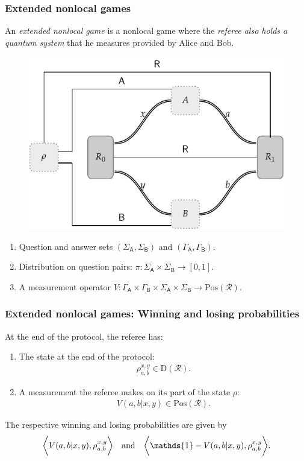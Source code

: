 \documentclass{beamer}
\def\I{\mathds{1}}
\newcommand{\biggip}[2]{\biggl\langle #1, #2 \biggr\rangle}
\def\R{\mathcal{R}}
\def \GammaA{\Gamma_{\reg{A}}}
\def \GammaB{\Gamma_{\reg{B}}}
\def \SigmaA{\Sigma_{\reg{A}}}
\def \SigmaB{\Sigma_{\reg{B}}}
\newcommand{\setft}[1]{\mathrm{#1}}
\newcommand{\Density}{\setft{D}}
\newcommand{\Pos}{\setft{Pos}}
\newcommand{\reg}[1]{\mathsf{#1}}
\begin{document}
\begin{frame}
	\frametitle{Extended nonlocal games}
	An \emph{extended nonlocal game} is a nonlocal game where the \emph{referee also holds a quantum system} that he measures provided by Alice and Bob. 
	\begin{figure}[!htpb] \label{fig:extended-nonlocal-game}
	\begin{center}
		\includegraphics[scale=0.7]{figures/enlg_2.pdf}
	\end{center}
\end{figure}
	\begin{enumerate}
		\item Question and answer sets $(\SigmaA,\SigmaB)$ and $(\GammaA,\GammaB)$. \vspace{1mm}		
		\item Distribution on question pairs: $\pi: \SigmaA \times \SigmaB \rightarrow [0,1]$.\vspace{1mm}
		\item A measurement operator $V: \GammaA \times \GammaB \times \SigmaA \times \SigmaB \rightarrow \Pos(\R)$.
	\end{enumerate}
\end{frame}

\begin{frame}
	\frametitle{Extended nonlocal games: Winning and losing probabilities}
	At the end of the protocol, the referee has: 
		\begin{enumerate}
			\item The state at the end of the protocol: 
				\begin{align*}
					\rho_{a,b}^{x,y} \in \Density(\R).
				\end{align*}
			\item A measurement the referee makes on its part of the state $\rho$: 
			\begin{align*}
				V(a,b|x,y) \in \Pos(\R).
			\end{align*}				
		\end{enumerate}
	The respective winning and losing probabilities are given by
		\begin{align*}
			\biggip{V(a,b|x,y)}{\rho_{a,b}^{x,y}} \quad \textnormal{and} \quad \biggip{\I - V(a,b|x,y)}{\rho_{a,b}^{x,y}}. 
		\end{align*}
\end{frame}
\end{document}
